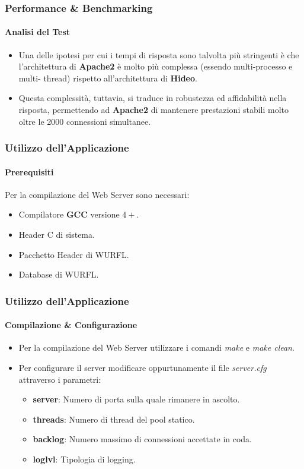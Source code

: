\documentclass{beamer}
\begin{document}
\begin{frame}
\frametitle{Performance \& Benchmarking}
\framesubtitle{Analisi del Test}

\begin{itemize}
\item Una delle ipotesi per cui i tempi di risposta sono talvolta più stringenti è che
l’architettura di \textbf{Apache2} è molto più complessa (essendo multi-processo e multi-
thread) rispetto all’architettura di \textbf{Hideo}.
\item Questa complessità, tuttavia, si traduce in robustezza ed affidabilità nella risposta,
permettendo ad \textbf{Apache2} di mantenere prestazioni stabili molto oltre le 2000
connessioni simultanee.
\end{itemize}
\end{frame}




\begin{frame}
\frametitle{Utilizzo dell'Applicazione}
\framesubtitle{Prerequisiti}
Per la compilazione del Web Server sono necessari:
\begin{itemize}
\item Compilatore \textbf{GCC} versione $4+$.
\item Header C di sistema.
\item Pacchetto Header di WURFL.
\item Database di WURFL.
\end{itemize}








\end{frame}



\begin{frame}
\frametitle{Utilizzo dell'Applicazione}
\framesubtitle{Compilazione \& Configurazione}

\begin{itemize}
\item Per la compilazione del Web Server utilizzare i comandi \textit{make} e \textit{make clean}.

\item Per configurare il server modificare oppurtunamente il file \textit{server.cfg} attraverso i parametri:
\begin{itemize}
\medskip
\item \textbf{server}: Numero di porta sulla quale rimanere in ascolto.
\medskip
\item \textbf{threads}: Numero di thread del pool statico.
\medskip
\item \textbf{backlog}: Numero massimo di connessioni accettate in coda.
\medskip
\item \textbf{loglvl}: Tipologia di logging.
\end{itemize}
\end{itemize}

\end{frame}
\end{document}
